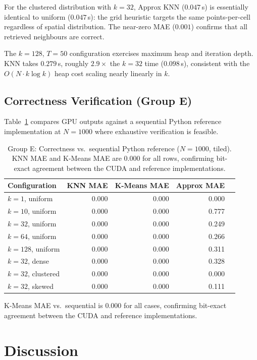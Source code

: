 \documentclass[11pt,a4paper]{article}
\begin{document}
For the clustered distribution with $k=32$, Approx KNN ($0.047$\,s) is
essentially identical to uniform ($0.047$\,s): the grid heuristic targets the
same points-per-cell regardless of spatial distribution.  The near-zero MAE
($0.001$) confirms that all retrieved neighbours are correct.

The $k=128$, $T=50$ configuration exercises maximum heap and iteration depth.
KNN takes $0.279$\,s, roughly $2.9\times$ the $k=32$ time ($0.098$\,s),
consistent with the $O(N \cdot k \log k)$ heap cost scaling nearly linearly in $k$.

\subsection{Correctness Verification (Group E)}

Table~\ref{tab:correctness} compares GPU outputs against a sequential Python
reference implementation at $N=1000$ where exhaustive verification is
feasible.

\begin{table}[H]
\centering
\caption{Group E: Correctness vs.\ sequential Python reference ($N=1000$,
tiled).  KNN MAE and K-Means MAE are 0.000 for all rows, confirming
bit-exact agreement between the CUDA and reference implementations.}
\label{tab:correctness}
\begin{tabular}{lrrrr}
\toprule
Configuration & KNN MAE & K-Means MAE & Approx MAE \\
\midrule
$k=1$,  uniform   & 0.000 & 0.000 & 0.000 \\
$k=10$, uniform   & 0.000 & 0.000 & 0.777 \\
$k=32$, uniform   & 0.000 & 0.000 & 0.249 \\
$k=64$, uniform   & 0.000 & 0.000 & 0.266 \\
$k=128$, uniform  & 0.000 & 0.000 & 0.311 \\
$k=32$, dense     & 0.000 & 0.000 & 0.328 \\
$k=32$, clustered & 0.000 & 0.000 & 0.000 \\
$k=32$, skewed    & 0.000 & 0.000 & 0.111 \\
\bottomrule
\end{tabular}
\end{table}


K-Means MAE vs.\ sequential is 0.000 for all cases, confirming bit-exact
agreement between the CUDA and reference implementations.  
\section{Discussion}
\end{document}
